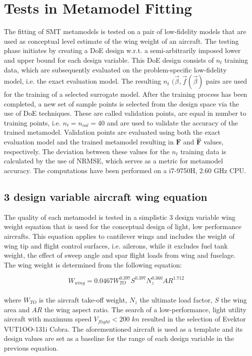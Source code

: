 \chapter{Tests in Metamodel Fitting}

The fitting of SMT metamodels is tested on a pair 
of low-fidelity models that are used as conceptual level 
estimate of the wing weight of an aircraft. The testing phase 
initiates by creating a DoE design w.r.t. a semi-arbitrarily 
imposed lower and upper bound for each design variable. This DoE 
design consists of $n_{t}$ training data, which are subsequently 
evaluated on the problem-specific low-fidelity model, i.e. the 
exact evaluation model. The resulting $n_{t}$ $(\vec{β},\vec{f}
(\vec{β})$ pairs are used for the training of a selected surrogate 
model. After the training process has been completed, a new set of 
sample points is selected from the design space via the use of DoE 
techniques. These are called validation points, are equal in number 
to training points, i.e. $n_{t} \!= \!n_{val} \!= \!40$ and are 
used to validate the accuracy of the trained metamodel. 
Validation points are evaluated using both the exact 
evaluation model and the trained metamodel resulting in 
$\mathbf{F}$ and $\hat{\mathbf{F}}$ values, respectively. The 
deviation between these values for the $n_{t}$ training data is 
calculated by the use of NRMSE, which serves as a metric for 
metamodel accuracy. The computations have been performed on a 
i7-9750H, 2.60 GHz CPU.
\vfill

\section{3 design variable aircraft wing equation}
\label{appendix:pseudo_aircraft}
The quality of each metamodel is tested in a simplistic 3 
design variable wing weight equation that is used for the 
conceptual design of light, low performance aircrafts. This 
equation applies to cantilever wings and includes the weight 
of wing tip and flight control surfaces, i.e. ailerons, while
it excludes fuel tank weight, the effect of sweep angle 
and spar flight loads from wing and fuselage. The wing 
weight is determined from the following 
equation\cite{wing_weight}:

\begin{equation}
W_{wing} = 0.0467W_{TO}^{0.397}S^{0.397}N_{z}^{0.360}
AR^{1.712}
\end{equation}
\\[-0.3cm]
where $W_{TO}$ is the aircraft take-off weight, $N_{z}$ 
the ultimate load factor, $S$ the wing area and $AR$ the 
wing aspect ratio. The search of a low-performance, light 
utility aircraft with maximum speed $V_{flight} < 200$ 
$kn$ resulted in the selection of Evektor VUT1OO-131i 
Cobra\cite{Evektor}. The aforementioned aircraft is used 
as a template and its design values are set as a baseline 
for the range of each design variable in the previous 
equation.

